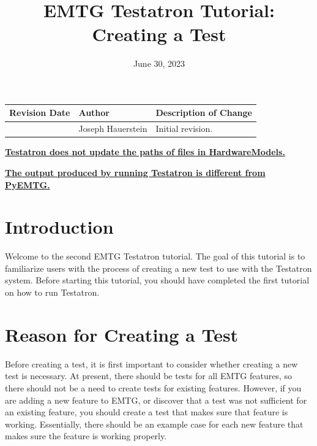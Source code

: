 \documentclass[11pt]{article}
\title{\Huge EMTG Testatron Tutorial: Creating a Test}
\newcommand{\knownissue}[3]
{
	\refstepcounter{knownissues}
	\par\noindent\textbf{\hyperref[#2_b]{\theknownissues\quad #1}}\label{#2_h}
	\textbf{\hfill\pageref{#2_b}}
	#3
}
\begin{document}
\begin{titlepage}
\maketitle
\thispagestyle{empty}
\begin{table}[H]
	\centering
	\begin{tabularx}{\textwidth}{|l|l|X|}
		\hline
		\textbf{Revision Date} & \textbf{Author} & \textbf{Description of Change} \\
		\hline
		\date{June 30, 2023} & Joseph Hauerstein & Initial revision.\\ 
		\hline
	\end{tabularx}
\end{table}
\end{titlepage}

\newpage
\tableofcontents
\thispagestyle{empty}
\newpage

\listofknownissues
\thispagestyle{empty}

\knownissue{Testatron does not update the paths of files in HardwareModels.}{hardware_options_file_paths_issue}

\knownissue{The output produced by running Testatron is different from PyEMTG.}{testatron_changes_emtgopt_issue}

\newpage
\clearpage
\setcounter{page}{1}


\section{Introduction}
\label{sec:introduction}

Welcome to the second \ac{EMTG} Testatron tutorial. The goal of this tutorial is to familiarize users with the process of creating a new test to use with the Testatron system. Before starting this tutorial, you should have completed the first tutorial on how to run Testatron. 

\section{Reason for Creating a Test}
\label{sec:reason_for_creating_a_test}

Before creating a test, it is first important to consider whether creating a new test is necessary. At present, there should be tests for all \ac{EMTG} features, so there should not be a need to create tests for existing features. However, if you are adding a new feature to \ac{EMTG}, or discover that a test was not sufficient for an existing feature, you should create a test that makes sure that feature is working. Essentially, there should be an example case for each new feature that makes sure the feature is working properly. 
\end{document}
